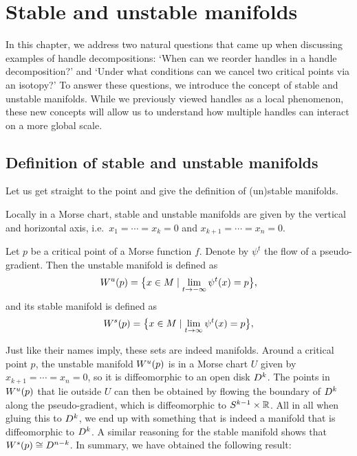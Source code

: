 \chapter{Stable and unstable manifolds}
\label{chap:stable-and-unstable-manifolds}



In this chapter, we address two natural questions that came up when discussing examples of handle decompositions: `When can we reorder handles in a handle decomposition?' and `Under what conditions can we cancel two critical points via an isotopy?'
To answer these questions, we introduce the concept of stable and unstable manifolds.
While we previously viewed handles as a local phenomenon, these new concepts will allow us to understand how multiple handles can interact on a more global scale.

\section{Definition of stable and unstable manifolds}
Let us get straight to the point and give the definition of (un)stable manifolds.
\begin{marginfigure}
    \centering
    \caption{Locally in a Morse chart, stable and unstable manifolds are given by the vertical and horizontal axis, i.e.\ $ x_1= \cdots= x_k = 0$ and $x_{k+1}= \cdots= x_n = 0$.}
    \label{fig:stable-and-unstable-manifolds-are-manifiolds}
\end{marginfigure}
\begin{definition}
    Let $p$ be a critical point of a Morse function $f$.
    Denote by $\psi^{t}$ the flow of a pseudo-gradient.
    Then the unstable manifold is defined as
    \[
        W^u(p) = \big\{x \in M  \mid  \lim_{t \to -\infty} \psi^{t} (x)  = p\big\} 
    ,\] 
    and its stable manifold is defined as
    \[
        W^s(p) = \big\{x \in M  \mid  \lim_{t \to \infty} \psi^{t} (x)  = p\big\} 
    ,\] 
\end{definition}
Just like their names imply, these sets are indeed manifolds.
Around a critical point $p$, the unstable manifold $W^u(p)$ is in a Morse chart $U$ given by $x_{k+1} = \cdots = x_n = 0$, so it is diffeomorphic to an open disk $D^{k}$.
The points in $W^u(p)$ that lie outside $U$ can then be obtained by flowing the boundary of $D^{k}$ along the pseudo-gradient, which is diffeomorphic to $S^{k-1} \times \mathbb{R}$. All in all when gluing this to $D^{k}$, we end up with something that is indeed a manifold that is diffeomorphic to $D^{k}$.
A similar reasoning for the stable manifold shows that $W^s(p) \cong D^{n - k}$.
In summary, we have obtained the following result:


